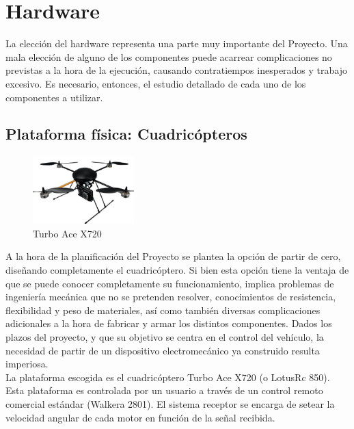 \documentclass[main]{subfiles}
\begin{document}
\chapter{Hardware}
La elecci\'on del hardware representa una parte muy importante del Proyecto. Una mala elecci\'on de alguno de los componentes puede acarrear complicaciones no previstas a la hora de la ejecuci\'on, causando contratiempos inesperados y trabajo excesivo. Es necesario, entonces, el estudio detallado de cada uno de los componentes a utilizar.

\section{Plataforma f\'isica: Cuadric\'opteros}

\begin{figure}
\vspace{20pt}
	\centering
	\includegraphics[width=0.35\textwidth]{./pics_eleccion_hardware/turboace.png}
	\caption{Turbo Ace X720}
	\label{fig:cuadricoptero}
\vspace{20pt}
\end{figure}

A la hora de la planificaci\'on del Proyecto se plantea la opci\'on de partir de cero, dise\~nando completamente el cuadric\'optero. Si bien esta opci\'on tiene la ventaja de que se puede conocer completamente su funcionamiento, implica problemas de ingenier\'ia mec\'anica que no se pretenden resolver, conocimientos de resistencia, flexibilidad y peso de materiales, as\'i como tambi\'en diversas complicaciones adicionales a la hora de fabricar y armar los distintos componentes. Dados los plazos del proyecto, y que su objetivo se centra en el control del veh\'iculo, la necesidad de partir de un dispositivo electromec\'anico ya construido resulta imperiosa.\\

La plataforma escogida es el cuadric\'optero Turbo Ace X720 (o LotusRc 850). Esta plataforma es controlada por un usuario a trav\'es de un control remoto comercial est\'andar (Walkera 2801). El sistema receptor se encarga de setear la velocidad angular de cada motor en funci\'on de la se\~nal recibida.
\end{document}
